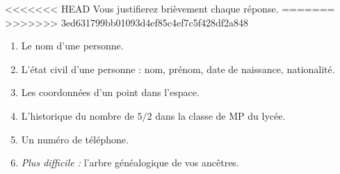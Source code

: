 <<<<<<< HEAD
Vous justifierez brièvement chaque réponse. 
=======
>>>>>>> 3ed631799bb01093d4ef85c4ef7c5f428df2a848

\begin{enumerate}[label = \emph{\alph*)}]
  \item Le nom d'une personne.
  \item L'état civil d'une personne : nom, prénom, date de naissance, nationalité.
  \item Les coordonnées d'un point dans l'espace.
  \item L'historique du nombre de $5/2$ dans la classe de MP du lycée. 
  \item Un numéro de téléphone. 
  \item \emph{Plus difficile :} l'arbre généalogique de vos ancêtres. 
\end{enumerate}